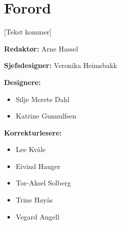 \chapter*{Forord}

[Tekst kommer]

\textbf{Redaktør:} Arne Hassel

\textbf{Sjefsdesigner:} Veronika Heimsbakk

\textbf{Designere:}

\begin{itemize}
	\item Silje Merete Dahl
	\item Katrine Gunnulfsen
\end{itemize}

\textbf{Korrekturlesere:}

\begin{itemize}
	\item Lee Kvåle
	\item Eivind Hauger
	\item Tor-Aksel Solberg
	\item Trine Høyås
	\item Vegard Angell
\end{itemize}

